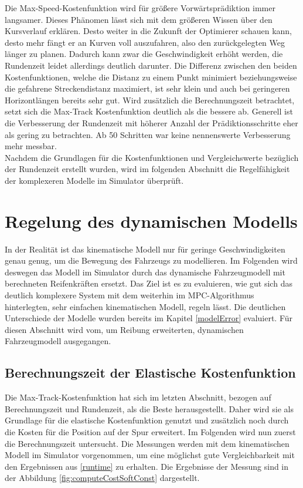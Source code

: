 \documentclass{like}
\begin{document}
Die Max-Speed-Kostenfunktion wird für größere Vorwärtsprädiktion immer langsamer. Dieses Phänomen lässt sich mit dem größeren Wissen über den Kursverlauf erklären. Desto weiter in die Zukunft der Optimierer schauen kann, desto mehr fängt er an  Kurven voll auszufahren, also den zurückgelegten Weg länger zu planen. Dadurch kann zwar die Geschwindigkeit erhöht werden, die Rundenzeit leidet allerdings deutlich darunter. 
Die Differenz zwischen den beiden Kostenfunktionen, welche die Distanz zu einem Punkt minimiert beziehungsweise die gefahrene Streckendistanz maximiert, ist sehr klein und auch bei geringeren Horizontlängen bereits sehr gut. Wird zusätzlich die Berechnungszeit betrachtet, setzt sich die Max-Track Kostenfunktion deutlich als die bessere ab. Generell ist die Verbesserung der Rundenzeit mit höherer Anzahl der Prädiktionsschritte eher als gering zu betrachten. Ab 50 Schritten war keine nennenswerte Verbesserung mehr messbar. \\
Nachdem die Grundlagen für die Kostenfunktionen und Vergleichswerte bezüglich der Rundenzeit erstellt wurden, wird im folgenden Abschnitt die Regelfähigkeit der kom\-plex\-eren Modelle im Simulator überprüft.

\section{Regelung des dynamischen Modells}
\label{dynModelcontrol}
In der Realität ist das kinematische Modell nur für geringe Geschwindigkeiten genau genug, um die Bewegung des Fahrzeugs zu modellieren. Im Folgenden wird deswegen das Modell im Simulator durch das dynamische Fahrzeugmodell mit berechneten Reifenkräften ersetzt. Das Ziel ist es zu evaluieren, wie gut sich das deutlich komplexere System mit dem weiterhin im \ac{MPC}-Algorithmus hinterlegten, sehr einfachen kinematischen Modell, regeln lässt.
Die deutlichen Unterschiede der Modelle wurden bereits im Kapitel \ref{modelError} evaluiert. Für diesen Abschnitt wird vom, um Reibung erweiterten, dynamischen Fahrzeugmodell ausgegangen.

\subsection{Berechnungszeit der Elastische Kostenfunktion}
Die Max-Track-Kostenfunktion hat sich im letzten Abschnitt, bezogen auf Berechnungszeit und Rundenzeit, als die Beste herausgestellt. Daher wird sie als Grundlage für die elastische Kostenfunktion genutzt und zusätzlich noch durch die Kosten für die Position auf der Spur erweitert. Im Folgenden wird nun zuerst die Berechnungszeit untersucht. Die Messungen werden mit dem kinematischen Modell im Simulator vorgenommen, um eine möglichst gute Vergleichbarkeit mit den Ergebnissen aus \ref{runtime} zu erhalten. Die Ergebnisse der Messung sind in der Abbildung \ref{fig:computeCostSoftConst} dargestellt.
\end{document}
